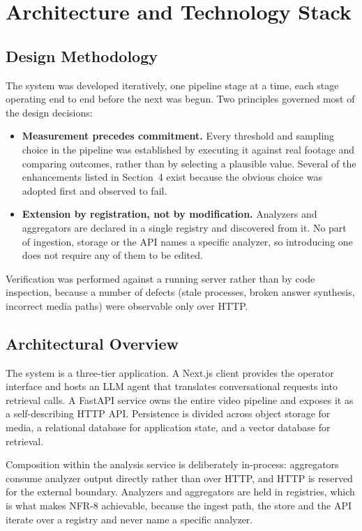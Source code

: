 \section{Architecture and Technology Stack}

\subsection{Design Methodology}

The system was developed iteratively, one pipeline stage at a time, each stage
operating end to end before the next was begun. Two principles governed most of the
design decisions:

\begin{itemize}
  \item \textbf{Measurement precedes commitment.} Every threshold and sampling choice
        in the pipeline was established by executing it against real footage and
        comparing outcomes, rather than by selecting a plausible value. Several of the
        enhancements listed in Section~4 exist because the obvious choice was adopted
        first and observed to fail.
  \item \textbf{Extension by registration, not by modification.} Analyzers and
        aggregators are declared in a single registry and discovered from it. No part
        of ingestion, storage or the API names a specific analyzer, so introducing one
        does not require any of them to be edited.
\end{itemize}

Verification was performed against a running server rather than by code inspection,
because a number of defects (stale processes, broken answer synthesis, incorrect
media paths) were observable only over HTTP.

\subsection{Architectural Overview}

The system is a three-tier application. A Next.js client provides the operator
interface and hosts an LLM agent that translates conversational requests into retrieval
calls. A FastAPI service owns the entire video pipeline and exposes it as a
self-describing HTTP API. Persistence is divided across object storage for media, a
relational database for application state, and a vector database for retrieval.

Composition within the analysis service is deliberately in-process: aggregators
consume analyzer output directly rather than over HTTP, and HTTP is reserved for the
external boundary. Analyzers and aggregators are held in registries, which is what
makes NFR-8 achievable, because the ingest path, the store and the API iterate over a
registry and never name a specific analyzer.

